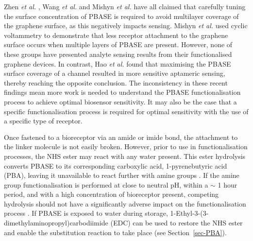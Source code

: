 \documentclass[
  a4paper,
]{scrbook}
\begin{document}
Zhen \emph{et al.} \autocite{Zhen2018}, Wang \emph{et al.}
\autocite{Wang2020} and Mishyn \emph{et al.} \autocite{Mishyn2022} have
all claimed that carefully tuning the surface concentration of PBASE is
required to avoid multilayer coverage of the graphene surface, as this
negatively impacts sensing. Mishyn \emph{et al.} \autocite{Mishyn2022}
used cyclic voltammetry to demonstrate that less receptor attachment to
the graphene surface occurs when multiple layers of PBASE are present.
However, none of these groups have presented analyte sensing results
from their functionalised graphene devices. In contrast, Hao \emph{et
al.} \autocite{Hao2020} found that maximising the PBASE surface coverage
of a channel resulted in more sensitive aptameric sensing, thereby
reaching the opposite conclusion. The inconsistency in these recent
findings mean more work is needed to understand the PBASE
functionalisation process to achieve optimal biosensor sensitivity. It
may also be the case that a specific functionalisation process is
required for optimal sensitivity with the use of a specific type of
receptor.

Once fastened to a bioreceptor via an amide or imide bond, the
attachment to the linker molecule is not easily broken. However, prior
to use in functionalisation processes, the NHS ester may react with any
water present. This ester hydrolysis converts PBASE to its corresponding
carboxylic acid, 1-pyrenebutyric acid (PBA), leaving it unavailable to
react further with amine groups
\autocite{Hermanson2013-3,Hermanson2013-5,Mishyn2022}. If the amine
group functionalisation is performed at close to neutral pH, within a
\(\sim\) 1 hour period, and with a high concentration of bioreceptor
present, competing hydrolysis should not have a significantly adverse
impact on the functionalisation process \autocite{Hermanson2013-3}. If
PBASE is exposed to water during storage,
1-Ethyl-3-(3-dimethylaminopropyl)carbodiimide (EDC) can be used to
restore the NHS ester and enable the substitution reaction to take place
(see Section~\ref{sec-PBA}).

\newpage
\thispagestyle{empty}
\end{document}
